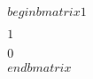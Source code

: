 \documentclass[preview]{standalone}
\begin{document}
\begin{align*}
\quad\\begin{bmatrix} 1 \quad\\\quad\\ 1 \quad\\\quad\\ 0 \quad\\end{bmatrix}
\end{align*}
\end{document}
